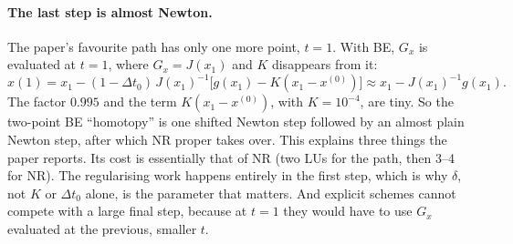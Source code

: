 \documentclass[11pt,a4paper]{article}
\newcommand{\xo}{x^{(0)}}
\begin{document}
\paragraph{The last step is almost Newton.} The paper's favourite path has only one more point, $t=1$.
With BE, $G_x$ is evaluated at $t=1$, where $G_x = J(x_1)$ and $K$ disappears from it:
\begin{equation}
  x(1) = x_1 - (1-\Delta t_0)\,J(x_1)^{-1}\bigl[g(x_1) - K(x_1-\xo)\bigr]
       \approx x_1 - J(x_1)^{-1} g(x_1).
\end{equation}
The factor $0.995$ and the term $K(x_1-\xo)$, with $K=10^{-4}$, are tiny. So the two-point BE ``homotopy''
is one shifted Newton step followed by an almost plain Newton step, after which NR proper takes over.
This explains three things the paper reports. Its cost is essentially that of NR (two LUs for the path,
then 3--4 for NR). The regularising work happens entirely in the first step, which is why $\delta$, not
$K$ or $\Delta t_0$ alone, is the parameter that matters. And explicit schemes cannot compete with a
large final step, because at $t=1$ they would have to use $G_x$ evaluated at the previous, smaller $t$.
\end{document}

